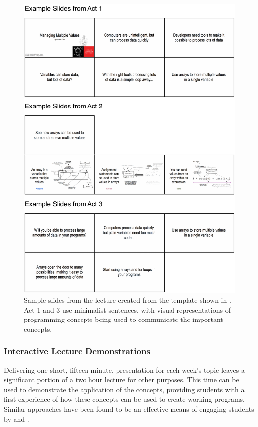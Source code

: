 \begin{figure}[htbp]
	\centering
	\includegraphics[width=\textwidth]{Lecture}
	\caption{Sample slides from the lecture created from the template shown in . Act 1 and 3 use minimalist sentences, with visual representations of programming concepts being used to communicate the important concepts.}
	\label{fig:lecture}
\end{figure}


\clearpage
\subsubsection{Interactive Lecture Demonstrations} %
\label{ssub:interactive_lecture_demonstrations}

Delivering one short, fifteen minute, presentation for each week's topic leaves a significant portion of a two hour lecture for other purposes. This time can be used to demonstrate the application of the concepts, providing students with a first experience of how these concepts can be used to create working programs. Similar approaches have been found to be an effective means of engaging students by \citet{Gaspar:2007} and \citet{Rubin:2013}.

